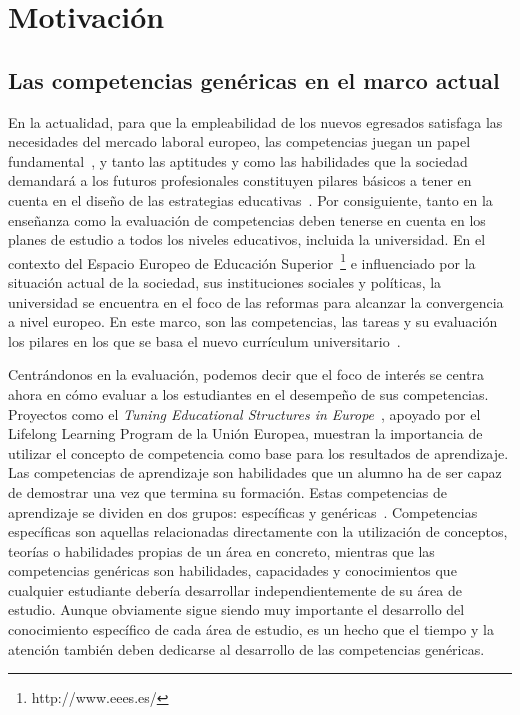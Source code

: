 


\section{Motivación}
\label{sec:Motivation}

\subsection*{Las competencias genéricas en el marco actual}

En la actualidad, para que la empleabilidad de los nuevos egresados satisfaga las necesidades del mercado laboral europeo, las competencias juegan un papel fundamental~\cite{communique2012making}, y tanto las aptitudes y como las habilidades que la sociedad demandará a los futuros profesionales constituyen pilares básicos a tener en cuenta en el diseño de las estrategias educativas~\cite{de2010project}. Por consiguiente, tanto en la enseñanza como la evaluación de competencias deben tenerse en cuenta en los planes de estudio a todos los niveles educativos, incluida la universidad. En el contexto del Espacio Europeo de Educación Superior~\footnote{http://www.eees.es/} e influenciado por la situación actual de  la sociedad, sus instituciones sociales y políticas, la universidad se encuentra en el foco de las reformas para alcanzar la convergencia a nivel europeo. En este marco, son las competencias, las tareas y su evaluación los pilares en los que se basa el nuevo currículum universitario~\cite{zabala2005espacio}.  

Centrándonos en la evaluación, podemos decir que el foco de interés se centra ahora en cómo evaluar a los estudiantes en el desempeño de sus competencias. Proyectos como el \emph{Tuning Educational Structures in Europe}~\cite{gonzalez2003tuning}, apoyado por el Lifelong Learning Program de la Unión Europea, muestran la importancia de utilizar el concepto de competencia como base para los resultados de aprendizaje. Las competencias de aprendizaje son habilidades que un alumno ha de ser capaz de demostrar una vez que termina su formación. Estas competencias de aprendizaje se dividen en dos grupos: específicas y genéricas~\cite{strijbos2015criteria}. Competencias específicas son aquellas relacionadas directamente con la utilización de conceptos, teorías o habilidades propias de un área en concreto, mientras que las competencias genéricas son habilidades, capacidades y conocimientos que cualquier estudiante debería desarrollar independientemente de su área de estudio. Aunque obviamente sigue siendo muy importante el desarrollo del conocimiento específico de cada área de estudio, es un hecho que el tiempo y la atención también deben dedicarse al desarrollo de las competencias genéricas. %

